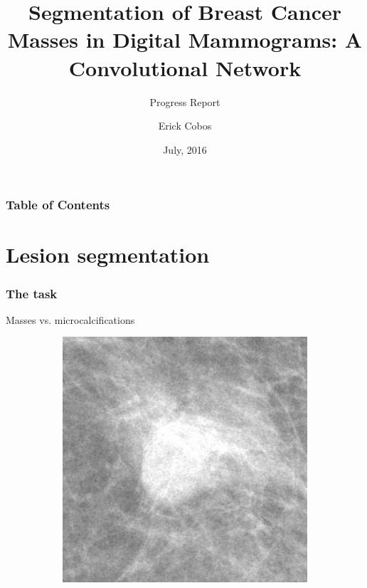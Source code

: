 \documentclass{beamer}
\title[Progress report]{Segmentation of Breast Cancer Masses in Digital Mammograms: A Convolutional Network}
\subtitle[Short subtitle]{Progress Report}
\author[Cobos] {Erick Cobos\inst{1}}
\date[July, 2016]{July, 2016}
\institute[Tec de Monterrey]{
	\inst{1} Centro de Sistemas Intelligentes \\ Tecnologico de Monterrey
}
\begin{document}
	\begin{frame}
		\titlepage
	\end{frame}
		
	\begin{frame}
		\frametitle{Table of Contents}
		\tableofcontents[currentsection]
    \end{frame}

	
	\section[Lesion segmentation]{Lesion segmentation}
	\begin{frame}
		\frametitle{The task}
		Masses vs. microcalcifications
		\begin{figure}[h]
			\centering
			\begin{subfigure}{0.35\textwidth}
				\includegraphics[width=\textwidth]{plots/breastMass.jpg}
			\end{subfigure}
			~
			\begin{subfigure}{0.35\textwidth}

\end{subfigure}
\end{figure}
\end{frame}
\end{document}
